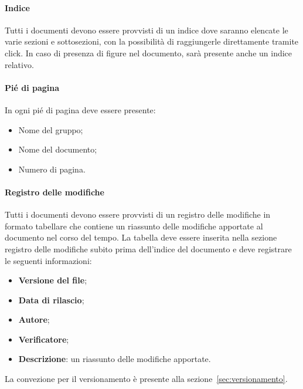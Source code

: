 \paragraph*{Indice}
Tutti i documenti devono essere provvisti di un indice dove saranno elencate le varie sezioni e sottosezioni, con la possibilità di raggiungerle direttamente tramite click.
In caso di presenza di figure nel documento, sarà presente anche un indice relativo.

\paragraph*{Pié di pagina}
In ogni pié di pagina deve essere presente:
\begin{itemize}
    \item Nome del gruppo;
    \item Nome del documento;
    \item Numero di pagina.
\end{itemize}

\paragraph*{Registro delle modifiche}
\label{sec:RegistroModifiche}
Tutti i documenti devono essere provvisti di un registro delle modifiche in formato tabellare che contiene un riassunto
delle modifiche apportate al documento nel corso del tempo.
La tabella deve essere inserita nella sezione registro delle modifiche subito prima dell’indice del documento e deve registrare le seguenti informazioni:
\begin{itemize}
    \item \textbf{Versione del file};
    \item \textbf{Data di rilascio};
    \item \textbf{Autore};
    \item \textbf{Verificatore};
    \item \textbf{Descrizione}: un riassunto delle modifiche apportate.
\end{itemize}
La convezione per il versionamento è presente alla sezione~\ref{sec:versionamento}.

